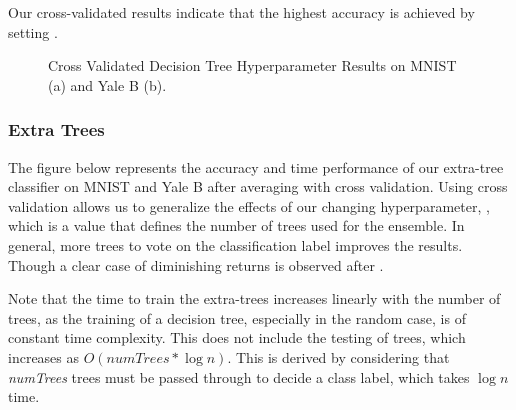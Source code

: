 Our cross-validated results indicate that the highest accuracy is achieved by setting .
%
\begin{figure}[H]
    \centering
    \caption{Cross Validated Decision Tree Hyperparameter Results on MNIST (a) and Yale B (b).}
\end{figure}

\subsubsection{Extra Trees}

The figure below represents the accuracy and time performance of our extra-tree classifier on MNIST and Yale B after averaging with cross validation. Using cross validation allows us to generalize the effects of our changing hyperparameter, , which is a value that defines the number of trees used for the ensemble. In general, more trees to vote on the classification label improves the results. Though a clear case of diminishing returns is observed after .

Note that the time to train the extra-trees increases linearly with the number of trees, as the training of a decision tree, especially in the random case, is of constant time complexity. This does not include the testing of trees, which increases as $O(numTrees\ast \log n)$. This is derived by considering that \textit{numTrees} trees must be passed through to decide a class label, which takes $\log n$ time.

